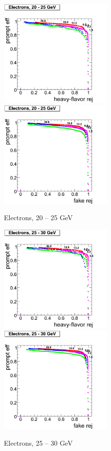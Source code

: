 \begin{figure}[htbp]
   \includegraphics[width = 0.5\textwidth]{pictures/bkgdRej_sigEff/elec_nonPrompt_ptCut3_ptCut4.png}
   \includegraphics[width = 0.5\textwidth]{pictures/bkgdRej_sigEff/elec_fake_ptCut3_ptCut4.png}
   \caption{Electrons, 20 -- 25 GeV}
   \label{fig:elec_ptCut3_ptCut4}
\end{figure}

\begin{figure}[htbp]
   \includegraphics[width = 0.5\textwidth]{pictures/bkgdRej_sigEff/elec_nonPrompt_ptCut4_ptCut5.png}
   \includegraphics[width = 0.5\textwidth]{pictures/bkgdRej_sigEff/elec_fake_ptCut4_ptCut5.png}
   \caption{Electrons, 25 -- 30 GeV}
   \label{fig:elec_ptCut4_ptCut5}
\end{figure}

